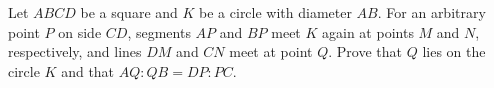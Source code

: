 Let $ABCD$ be a square and $K$ be a circle with diameter $AB$. For an arbitrary point $P$ on side $CD$, segments $AP$ and $BP$ meet $K$ again at points $M$ and $N$, respectively, and lines $DM$ and $CN$ meet at point $Q$. Prove that $Q$ lies on the circle $K$ and that $AQ : QB = DP : PC$.